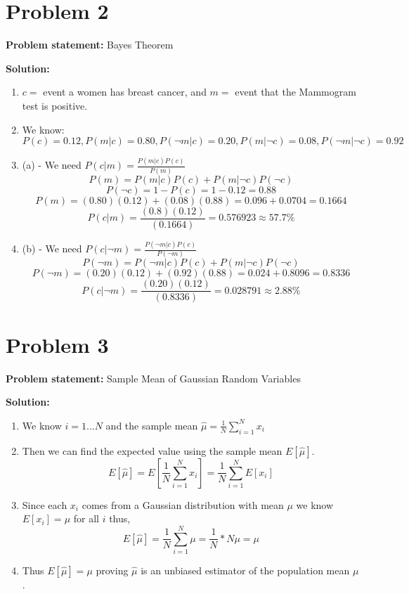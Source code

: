 \documentclass[12pt]{article}
\begin{document}
\section*{Problem 2}
\textbf{Problem statement:} Bayes Theorem

\bigskip

\textbf{Solution:}

\begin{enumerate}
    \item $c =$ event a women has breast cancer, and $m = $ event that the Mammogram test is positive. 
    \item We know: $P(c) = 0.12, P(m|c) = 0.80, P(\neg m|c) = 0.20, P(m|\neg c) = 0.08, P(\neg m|\neg c) = 0.92$
    \item (a) - We need $P(c|m) = \frac{P(m|c)P(c)}{P(m)}$
	\[
	P(m) = P(m|c)P(c) + P(m|\neg c)P(\neg c)
	\]    
	\[
	P(\neg c) = 1 - P(c) = 1 - 0.12 = 0.88
	\]
	\[
	P(m) = (0.80)(0.12) + (0.08)(0.88) = 0.096 + 0.0704 = 0.1664
	\]
	\[
	P(c|m) = \frac{(0.8)(0.12)}{(0.1664)} = 0.576923 \approx \boxed{57.7\%}
	\]
	\item (b) - We need $P(c|\neg m) = \frac{P(\neg m|c)P(c)}{P(\neg m)}$
	\[
	P(\neg m) = P(\neg m|c)P(c) + P(m|\neg c)P(\neg c)
	\]    
	\[
	P(\neg m) = (0.20)(0.12) + (0.92)(0.88) = 0.024 + 0.8096 = 0.8336
	\]
	\[
	P(c|\neg m) = \frac{(0.20)(0.12)}{(0.8336)} = 0.028791 \approx \boxed{2.88\%}
	\]
\end{enumerate}

\section*{Problem 3}
\textbf{Problem statement:} Sample Mean of Gaussian Random Variables

\bigskip

\textbf{Solution:}

\begin{enumerate}
    \item We know $i = 1 ... N$ and the sample mean $\hat{\mu} = \frac{1}{N}\sum_{i=1}^{N}x_{i}$
    \item Then we can find the expected value using the sample mean $E[\hat{\mu}]$.
    \[
    E[\hat{\mu}] = E\left[\frac{1}{N}\sum_{i=1}^{N}x_{i}\right] = \frac{1}{N}\sum_{i=1}^{N}E[x_{i}]
    \]
    \item Since each $x_{i}$ comes from a Gaussian distribution with mean $\mu$ we know $E[x_{i}] = \mu$ for all $i$ thus,
    \[
    E[\hat{\mu}] = \frac{1}{N}\sum_{i=1}^{N}\mu = \frac{1}{N}*N\mu = \mu
    \]
    \item Thus $E[\hat{\mu}] = \mu$ proving $\hat{\mu}$ is an unbiased estimator of the population mean $\mu$.
\end{enumerate}
\end{document}
